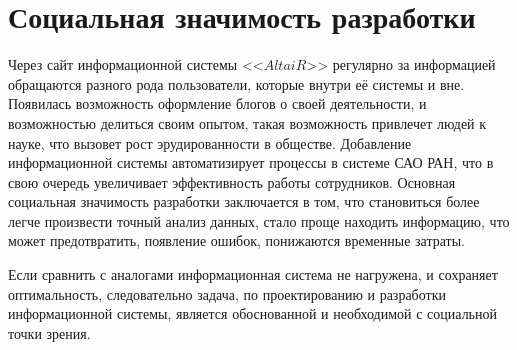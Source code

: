 \section{Социальная значимость разработки}
Через сайт информационной системы <<$AltaiR$>> регулярно за информацией обращаются разного рода пользователи, которые внутри её системы и вне. Появилась возможность оформление блогов о своей деятельности, и возможностью делиться своим опытом, такая возможность привлечет людей к науке, что вызовет рост эрудированности в обществе. 
Добавление информационной системы автоматизирует процессы в системе САО РАН, что в свою очередь увеличивает эффективность работы сотрудников. Основная социальная значимость разработки заключается в том, что становиться более легче произвести точный анализ данных, стало проще находить информацию, что может предотвратить, появление ошибок, понижаются временные затраты.

Если сравнить с аналогами информационная система не нагружена, и сохраняет оптимальность, следовательно задача, по проектированию и разработки информационной системы, является обоснованной и необходимой с социальной точки зрения.  

\pagebreak